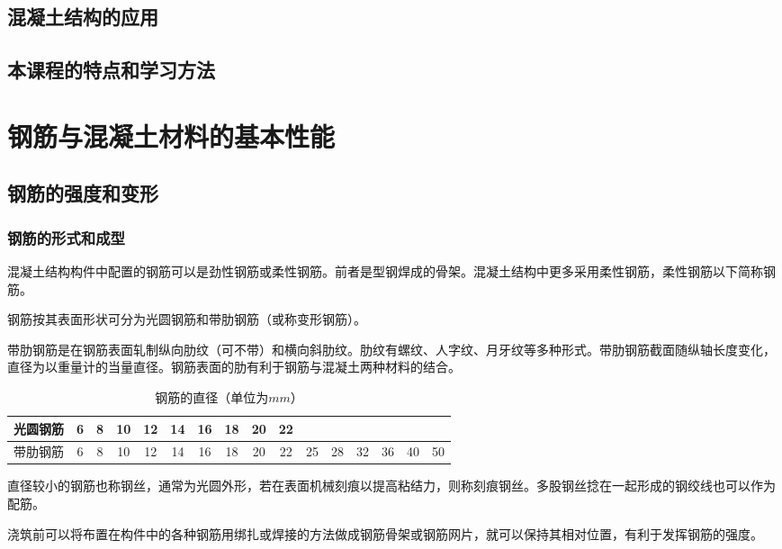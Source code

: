 \documentclass{article}
\begin{document}
\subsection{混凝土结构的应用}
\subsection{本课程的特点和学习方法}
\section{钢筋与混凝土材料的基本性能}
\subsection{钢筋的强度和变形}
\subsubsection{钢筋的形式和成型}
\par 混凝土结构构件中配置的钢筋可以是劲性钢筋或柔性钢筋。前者是型钢焊成的骨架。混凝土结构中更多采用柔性钢筋，柔性钢筋以下简称钢筋。
\par 钢筋按其表面形状可分为光圆钢筋和带肋钢筋（或称变形钢筋）。
\par 带肋钢筋是在钢筋表面轧制纵向肋纹（可不带）和横向斜肋纹。肋纹有螺纹、人字纹、月牙纹等多种形式。带肋钢筋截面随纵轴长度变化，直径为以重量计的当量直径。钢筋表面的肋有利于钢筋与混凝土两种材料的结合。
\begin{table}[htbp]
      \caption{钢筋的直径（单位为$mm$）}
      \begin{center}
            \begin{tabular}{|c|ccccccccc|cccccc|}
                  \hline
                  光圆钢筋 & 6 & 8 & 10 & 12 & 14 & 16 & 18 & 20 & 22 &    &    &    &    &    &    \\
                  \hline
                  带肋钢筋 & 6 & 8 & 10 & 12 & 14 & 16 & 18 & 20 & 22 & 25 & 28 & 32 & 36 & 40 & 50 \\
                  \hline
            \end{tabular}
      \end{center}
\end{table}
\par 直径较小的钢筋也称钢丝，通常为光圆外形，若在表面机械刻痕以提高粘结力，则称刻痕钢丝。多股钢丝捻在一起形成的钢绞线也可以作为配筋。
\par 浇筑前可以将布置在构件中的各种钢筋用绑扎或焊接的方法做成钢筋骨架或钢筋网片，就可以保持其相对位置，有利于发挥钢筋的强度。
\end{document}
